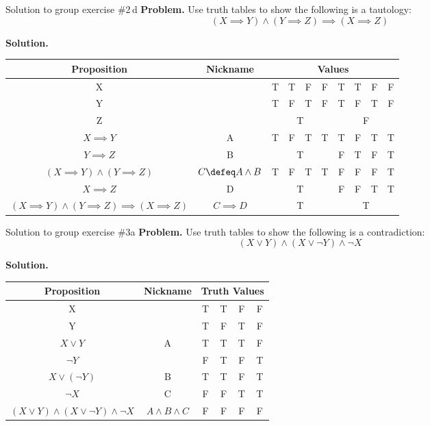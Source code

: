 \documentclass[10pt]{beamer}
\begin{document}
\begin{frame}{Solution to group exercise \#2\,d}
\footnotesize 
\textbf{Problem.} Use truth tables to show the following is a tautology:
\[ (X \implies Y) \land (Y \implies Z) \implies (X \implies Z) \]

\vfill 
\textbf{Solution.}
\begin{table}[h]
    \centering
    \begin{tabular}{cc|c c c c |c c c c}
        \toprule 
        \textbf{Proposition} & \textbf{Nickname} & \multicolumn{8}{c}{\textbf{Values}} \\
        \midrule
        X &&T&T&F&F&T&T&F&F \\
        Y &&T&F&T&F&T&F&T&F \\
        Z && \multicolumn{4}{c}{\cellcolor[gray]{0.9} T} &  \multicolumn{4}{c}{ \cellcolor[gray]{0.7} F}\\  
        \midrule
        $X \implies Y$&A &T&F&T&T&T&F&T&T \\
        $Y \implies Z$&B &\multicolumn{4}{c}{\cellcolor[gray]{0.9} T}&F&T&F&T \\
        $(X \implies Y) \land (Y \implies Z)$ &$C \defeq A \land B$ &T&F&T&T&F&F&F&T \\
        $X \implies Z$ &D &\multicolumn{4}{c}{\cellcolor[gray]{0.9} T} & F & F & T & T \\
         \tiny $(X \implies Y) \land (Y \implies Z) \implies (X \implies Z)$ &$C \implies D$&\multicolumn{4}{c}{\cellcolor[gray]{0.9} T} &  \multicolumn{4}{c}{ \cellcolor[gray]{0.7} T}\\
        \bottomrule
    \end{tabular}
\end{table}	
\end{frame}

\begin{frame}{Solution to group exercise \#3a}
\footnotesize 
\textbf{Problem.} Use truth tables to show the following is a contradiction:
\[ (X \lor Y) \land (X \lor \lnot Y) \land \lnot X \]

\vfill 
\textbf{Solution.}
\begin{table}[h]
    \centering
    \begin{tabular}{c | c|c c c c}
        \toprule 
        \textbf{Proposition} & \textbf{Nickname}& \multicolumn{4}{c}{\textbf{Truth Values}} \\
        \midrule
        X &&T&T&F&F\\
        Y &&T&F&T&F\\ 
        \midrule
        $X \lor Y$&A&T&T&T&F\\
        \midrule 
        $\lnot Y$ &&F&T&F&T \\
        $X \lor (\lnot Y)$&B &T&T&F&T \\
        \midrule 
        $\lnot X$&C &F&F&T&T \\
        $(X \lor Y) \land (X \lor \lnot Y) \land \lnot X$ & $A \land B \land C$ &F&F&F&F \\
        \bottomrule
    \end{tabular}
\end{table}	
\end{frame}
\end{document}
